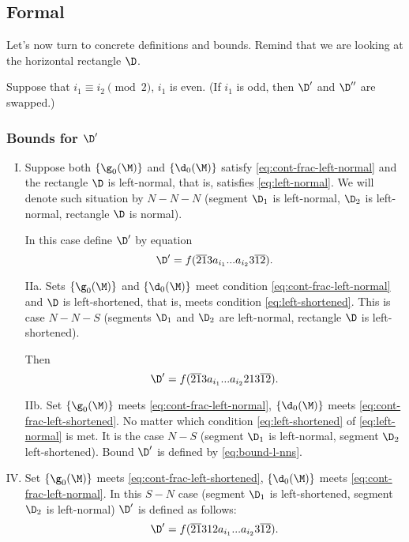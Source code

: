 \subsection{Formal}
\label{sbsc:boundaries_formal}

Let's now turn to concrete definitions and bounds.
Remind that we are looking at the horizontal rectangle $\D$.

Suppose that $i_1 \equiv i_2 \pmod 2$, $i_1$ is even.
(If $i_1$ is odd, then $\D'$ and $\D''$ are swapped.)

\subsubsection{Bounds for $\D'$}

\begin{enumerate}[I.]
	\item Suppose both $\{\g_0(\M)\}$ and $\{\d_0(\M)\}$
	satisfy \ref{eq:cont-frac-left-normal} and the rectangle $\D$ is left-normal,
	that is, satisfies \ref{eq:left-normal}.
	We will denote such situation by $N-N-N$
	(segment $\D_1$ is left-normal, $\D_2$ is left-normal, rectangle $\D$ is normal).
	
	In this case define $\D'$ by equation
	\begin{equation}\label{eq:bound-l-nnn}
		\D' = f(\overline{21}3a_{i_1}... a_{i_2}3\overline{12}).
	\end{equation}
	
	\item[IIa.] Sets $\{\g_0(\M)\}$ and $\{\d_0(\M)\}$
	meet condition \ref{eq:cont-frac-left-normal}
	and $\D$ is left-shortened, that is, meets condition \ref{eq:left-shortened}.
	This is case $N-N-S$
	(segments $\D_1$ and $\D_2$ are left-normal, rectangle $\D$ is left-shortened).
	
	Then
	\begin{equation}\label{eq:bound-l-nns}
		\D' = f(\overline{21}3a_{i_1}... a_{i_2}213\overline{12}).
	\end{equation}
	
	\item[IIb.] Set $\{\g_0(\M)\}$ meets \ref{eq:cont-frac-left-normal},
	$\{\d_0(\M)\}$ meets \ref{eq:cont-frac-left-shortened}.
	No matter which condition \ref{eq:left-shortened} of \ref{eq:left-normal} is met.
	It is the case $N-S$
	(segment $\D_1$ is left-normal, segment $\D_2$ left-shortened).
	Bound $\D'$ is defined by \ref{eq:bound-l-nns}.
	
	\addtocounter{enumi}{1}
	\item Set $\{\g_0(\M)\}$ meets \ref{eq:cont-frac-left-shortened},
	$\{\d_0(\M)\}$ meets \ref{eq:cont-frac-left-normal}.
	In this $S-N$ case
	(segment $\D_1$ is left-shortened, segment $\D_2$ is left-normal)
	$\D'$ is defined as follows:
	\begin{equation}\label{eq:bound-l-sn}
		\D' = f(\overline{21}312a_{i_1}... a_{i_2}3\overline{12}).
	\end{equation}
	

\end{enumerate}
